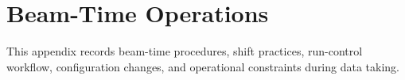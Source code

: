 \section{Beam-Time Operations}

This appendix records beam-time procedures, shift practices, run-control
workflow, configuration changes, and operational constraints during data taking.
